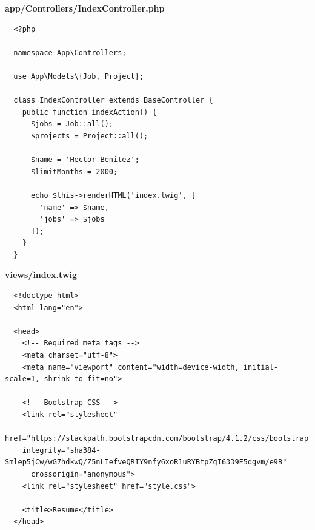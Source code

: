 \documentclass{article}
\begin{document}
\textbf{app/Controllers/IndexController.php}
\begin{verbatim}
  <?php

  namespace App\Controllers;

  use App\Models\{Job, Project};

  class IndexController extends BaseController {
    public function indexAction() {
      $jobs = Job::all();
      $projects = Project::all();

      $name = 'Hector Benitez';
      $limitMonths = 2000;

      echo $this->renderHTML('index.twig', [
        'name' => $name,
        'jobs' => $jobs
      ]);
    }
  }
\end{verbatim}

\textbf{views/index.twig}
\begin{verbatim}
  <!doctype html>
  <html lang="en">

  <head>
    <!-- Required meta tags -->
    <meta charset="utf-8">
    <meta name="viewport" content="width=device-width, initial-scale=1, shrink-to-fit=no">

    <!-- Bootstrap CSS -->
    <link rel="stylesheet"
    href="https://stackpath.bootstrapcdn.com/bootstrap/4.1.2/css/bootstrap.min.css"
    integrity="sha384-Smlep5jCw/wG7hdkwQ/Z5nLIefveQRIY9nfy6xoR1uRYBtpZgI6339F5dgvm/e9B"
      crossorigin="anonymous">
    <link rel="stylesheet" href="style.css">

    <title>Resume</title>
  </head>


\end{verbatim}
\end{document}
